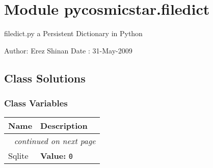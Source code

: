 %
%
%


\section{Module pycosmicstar.filedict}

    \label{pycosmicstar:filedict}
filedict.py a Persistent Dictionary in Python

Author: Erez Shinan Date  : 31-May-2009



\subsection{Class Solutions}

    \label{pycosmicstar:filedict:Solutions}


  \subsubsection{Class Variables}

    \vspace{-1cm}
\hspace{\varindent}\begin{longtable}{|p{\varnamewidth}|p{\vardescrwidth}|l}
\cline{1-2}
\cline{1-2} \centering \textbf{Name} & \centering \textbf{Description}& \\
\cline{1-2}
\endhead\cline{1-2}\multicolumn{3}{r}{\small\textit{continued on next page}}\\\endfoot\cline{1-2}
\endlastfoot\raggedright S\-q\-l\-i\-t\-e\-3\- & \raggedright \textbf{Value:} 
{\tt 0}&\\
\cline{1-2}
\end{longtable}

